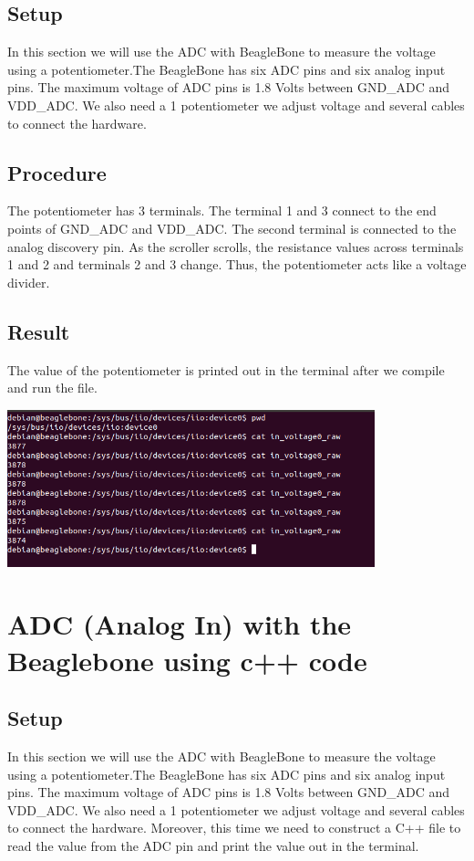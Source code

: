\documentclass{article}
\begin{document}
\subsection{Setup}
In this section we will use the ADC with BeagleBone to measure the voltage using a potentiometer.The BeagleBone has six ADC pins and six analog input pins. The maximum voltage of ADC pins is 1.8 Volts between GND\_ADC and VDD\_ADC.
We also need a 1 potentiometer we adjust voltage and several cables to connect the hardware. 
\subsection{Procedure}
The potentiometer has 3 terminals. The terminal 1 and 3 connect to the end points of GND\_ADC and VDD\_ADC. The second terminal is connected to the analog discovery pin. As the scroller scrolls, the resistance values across terminals 1 and 2 and terminals 2 and 3 change. Thus, the potentiometer acts like a voltage divider. 
\subsection{Result}
The value of the potentiometer is printed out in the terminal after we compile and run the file.
\begin{center}
	\includegraphics[width=0.8\textwidth]{img/Lab1_8.PNG}
\end{center}
\clearpage
\section{ADC (Analog In) with the Beaglebone using c++ code}
\subsection{Setup}
In this section we will use the ADC with BeagleBone to measure the voltage using a potentiometer.The BeagleBone has six ADC pins and six analog input pins. The maximum voltage of ADC pins is 1.8 Volts between GND\_ADC and VDD\_ADC.
We also need a 1 potentiometer we adjust voltage and several cables to connect the hardware. Moreover, this time we need to construct a C++ file to read the value from the ADC pin and print the value out in the terminal.
\end{document}
